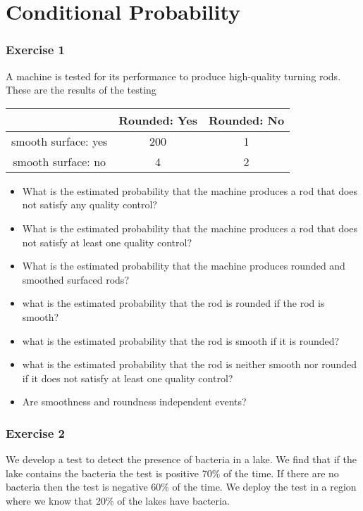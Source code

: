 \documentclass[
]{book}
\begin{document}
\hypertarget{conditional-probability-3}{%
\section{Conditional Probability}\label{conditional-probability-3}}

\hypertarget{exercise-1-2}{%
\subsubsection{Exercise 1}\label{exercise-1-2}}

A machine is tested for its performance to produce high-quality turning rods. These are the results of the testing

\begin{longtable}[]{@{}ccc@{}}
\toprule
& Rounded: Yes & Rounded: No \\
\midrule
\endhead
smooth surface: yes & 200 & 1 \\
smooth surface: no & 4 & 2 \\
\bottomrule
\end{longtable}

\begin{itemize}
\item
  What is the estimated probability that the machine produces a rod that does not satisfy any quality control?
\item
  What is the estimated probability that the machine produces a rod that does not satisfy at least one quality control?
\item
  What is the estimated probability that the machine produces rounded and smoothed surfaced rods?
\item
  what is the estimated probability that the rod is rounded if the rod is smooth?
\item
  what is the estimated probability that the rod is smooth if it is rounded?
\item
  what is the estimated probability that the rod is neither smooth nor rounded if it does not satisfy at least one quality control?
\item
  Are smoothness and roundness independent events?
\end{itemize}

\hypertarget{exercise-2-2}{%
\subsubsection{Exercise 2}\label{exercise-2-2}}

We develop a test to detect the presence of bacteria in a lake. We find that if the lake contains the bacteria the test is positive 70\% of the time. If there are no bacteria then the test is negative 60\% of the time. We deploy the test in a region where we know that 20\% of the lakes have bacteria.
\end{document}
